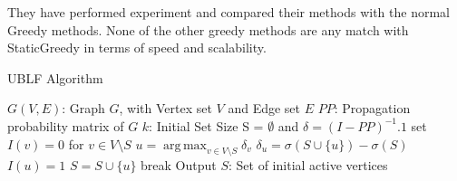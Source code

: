 \documentclass[english]{tktltiki}
\DeclareMathOperator*{\argmax}{arg\,max}
\begin{document}
They have performed experiment and compared their methods with the normal Greedy methods. None of the other greedy methods are any match with StaticGreedy in terms of speed and scalability.
\begin{algorithm}[ht!]
\caption{UBLF Algorithm  \cite{zhuo13}}
\label{alg:ublf}
\begin{algorithmic}
\Require $G(V,E)$: Graph $G$, with Vertex set $V$ and Edge set $E$
\Require $PP$: Propagation probability matrix of $G$
\Require $k$: Initial Set Size
\State S = $\emptyset$ and $\delta = (I - PP)^{-1} .1$ 
	\State set $I(v) = 0$ for $v \in V \setminus S$
		\State $u =  \argmax_{v \in V \setminus S}\delta_v$ 
			\State $\delta_u = \sigma( S \cup \{u\}) - \sigma(S)$
			\State $I(u)=1$
		\EndIf
			\State $S = S \cup \{u\}$
			\State break
		\EndIf
	\EndWhile 
\EndFor
\State Output $S$: Set of initial active vertices
\end{algorithmic}
\end{algorithm}
\end{document}

